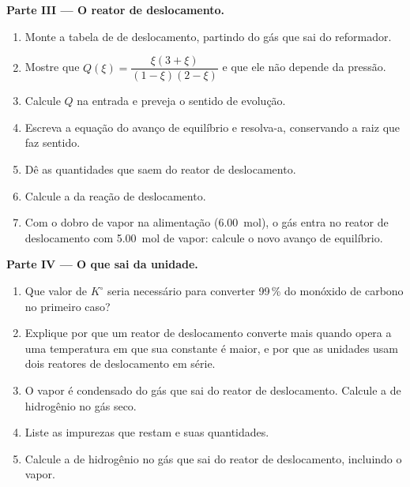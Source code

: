 \begin{problem}
\medskip
\noindent\textbf{Parte III --- O reator de deslocamento.}
\begin{enumerate}[resume]
  \item Monte a tabela de  de deslocamento, partindo do
        gás que sai do reformador.
  \item Mostre que $Q(\xi) = \dfrac{\xi(3 + \xi)}{(1 - \xi)(2 - \xi)}$ e
        que ele não depende da pressão.
  \item Calcule $Q$ na entrada e preveja o sentido de evolução.
  \item Escreva a equação do avanço de equilíbrio e resolva-a,
        conservando a raiz que faz sentido.
  \item Dê as quantidades que saem do reator de deslocamento.
  \item Calcule a  da reação de deslocamento.
  \item Com o dobro de vapor na alimentação (\qty{6.00}{mol}), o gás
        entra no reator de deslocamento com \qty{5.00}{mol} de vapor:
        calcule o novo avanço de equilíbrio.
\end{enumerate}

\medskip
\noindent\textbf{Parte IV --- O que sai da unidade.}
\begin{enumerate}[resume]
  \item Que valor de $K^\circ$ seria necessário para converter 99\,\% do
        monóxido de carbono no primeiro caso?
  \item Explique por que um reator de deslocamento converte mais quando
        opera a uma temperatura em que sua constante é maior, e por que
        as unidades usam dois reatores de deslocamento em série.
  \item O vapor é condensado do gás que sai do reator de deslocamento.
        Calcule a  de hidrogênio no gás seco.
  \item Liste as impurezas que restam e suas quantidades.
  \item Calcule a  de hidrogênio no gás que sai do reator de
        deslocamento, incluindo o vapor.
\end{enumerate}
\end{problem}
